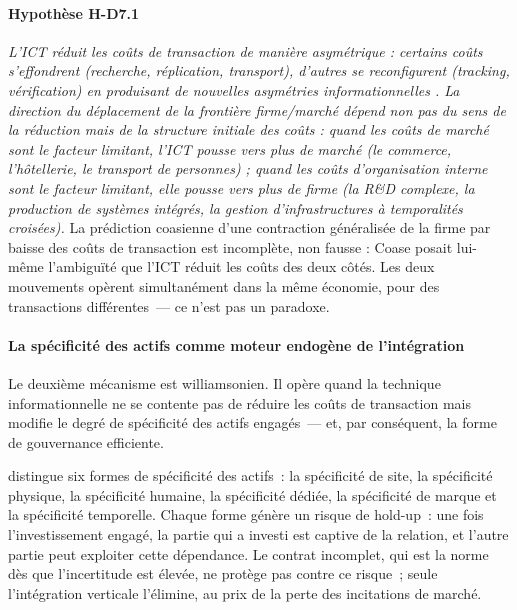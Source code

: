 \paragraph{Hypothèse H-D7.1} \emph{L'ICT réduit les coûts de transaction de manière asymétrique : certains coûts s'effondrent (recherche, réplication, transport), d'autres se reconfigurent (tracking, vérification) en produisant de nouvelles asymétries informationnelles \parencite{goldfarb_digital_2019}. La direction du déplacement de la frontière firme/marché dépend non pas du sens de la réduction mais de la structure initiale des coûts : quand les coûts de marché sont le facteur limitant, l'ICT pousse vers plus de marché (le commerce, l'hôtellerie, le transport de personnes) ; quand les coûts d'organisation interne sont le facteur limitant, elle pousse vers plus de firme (la R\&D complexe, la production de systèmes intégrés, la gestion d'infrastructures à temporalités croisées).} La prédiction coasienne d'une contraction généralisée de la firme par baisse des coûts de transaction est incomplète, non fausse : Coase posait lui-même l'ambiguïté que l'ICT réduit les coûts des deux côtés. Les deux mouvements opèrent simultanément dans la même économie, pour des transactions différentes~--- ce n'est pas un paradoxe.

\paragraph{La spécificité des actifs comme moteur endogène de l'intégration}

\markINST \markSTS
Le deuxième mécanisme est williamsonien. Il opère quand la technique informationnelle ne se contente pas de réduire les coûts de transaction mais modifie le degré de spécificité des actifs engagés~--- et, par conséquent, la forme de gouvernance efficiente.

\textcite{williamson_economic_1985} distingue six formes de spécificité des actifs~: la spécificité de site, la spécificité physique, la spécificité humaine, la spécificité dédiée, la spécificité de marque et la spécificité temporelle. Chaque forme génère un risque de hold-up~: une fois l'investissement engagé, la partie qui a investi est captive de la relation, et l'autre partie peut exploiter cette dépendance. Le contrat incomplet, qui est la norme dès que l'incertitude est élevée, ne protège pas contre ce risque~; seule l'intégration verticale l'élimine, au prix de la perte des incitations de marché.

